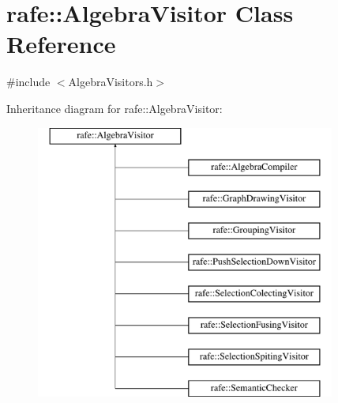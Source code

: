 \hypertarget{classrafe_1_1_algebra_visitor}{\section{rafe\+:\+:Algebra\+Visitor Class Reference}
\label{classrafe_1_1_algebra_visitor}
}


{\ttfamily \#include $<$Algebra\+Visitors.\+h$>$}

Inheritance diagram for rafe\+:\+:Algebra\+Visitor\+:\begin{figure}[H]
\begin{center}
\leavevmode
\includegraphics[height=9.000000cm]{classrafe_1_1_algebra_visitor}
\end{center}
\end{figure}
